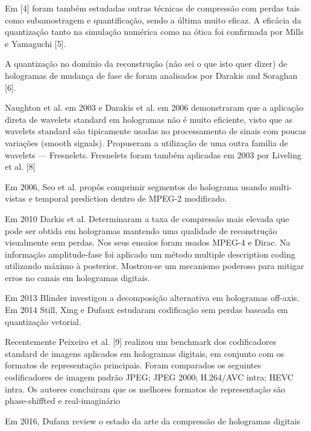 Em [4] foram também estudadas outras técnicas de compressão com perdas tais como subamostragem e quantificação, sendo a última muito eficaz. A eficácia da quantização tanto na simulação numérica como na ótica foi confirmada por Mills e Yamaguchi [5].

A quantização no domínio da reconstrução (não sei o que isto quer dizer) de hologramas de mudança de fase de foram analisados por Darakis and Soraghan [6].

Naughton et al. em 2003 e Darakis et al. em 2006 demonstraram que a aplicação direta de wavelets standard em hologramas não é muito eficiente, visto que as wavelets standard são tipicamente usadas no processamento de sinais com poucas variações (smooth signals). Propuseram a utilização de uma outra familia de wavelets — Fresnelets. Fresnelets foram também aplicadas em 2003 por Liveling et al. [8]

Em 2006, Seo et al. propôs comprimir segmentos do holograma usando multi-vistas e temporal prediction dentro de MPEG-2 modificado.

Em 2010 Darkis et al. Determinaram a taxa de compressão mais elevada que pode ser obtida em hologramas mantendo uma qualidade de reconstrução visualmente sem perdas. Nos seus ensaios foram usados MPEG-4 e Dirac. Na informação amplitude-fase foi aplicado um método multiple description coding utilizando máximo à posterior. Mostrou-se um mecanismo poderoso para mitigar erros no canais em hologramas digitais.

Em 2013 Blinder investigou a decomposição alternativa em hologramas off-axis.
Em 2014 Still, Xing e Dufaux estudaram codificação sem perdas baseada em quantização vetorial. 

Recentemente Peixeiro et al. [9] realizou um benchmark dos codificadores standard de imagens aplicados em hologramas digitais, em conjunto com os formatos de representação principais. Foram comparados os seguintes codificadores de imagem padrão
  JPEG;
  JPEG 2000;
  H.264/AVC intra;
  HEVC intra.
Os autores concluiram que os melhores formatos de representação são phase-shiffted e real-imaginário

Em 2016, Dufaux review o estado da arte da compressão de hologramas digitais

